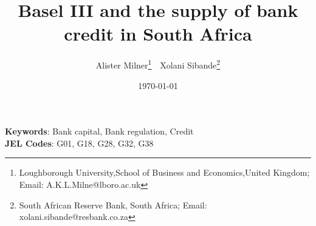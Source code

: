 
\title{Basel III and the supply of bank credit in South Africa}


\author { 
Alister Milner\footnote{Loughborough University,School of Business and Economics,United Kingdom; Email: A.K.L.Milne@lboro.ac.uk}  \,\, 
Xolani Sibande\footnote{South African Reserve Bank, South Africa; Email: xolani.sibande@resbank.co.za}
}
\date{\today}
\maketitle

\begin{abstract}


\end{abstract}

\noindent\textbf{Keywords}: Bank capital, Bank regulation, Credit   \\
\textbf{JEL Codes}: G01, G18, G28, G32, G38
\newpage